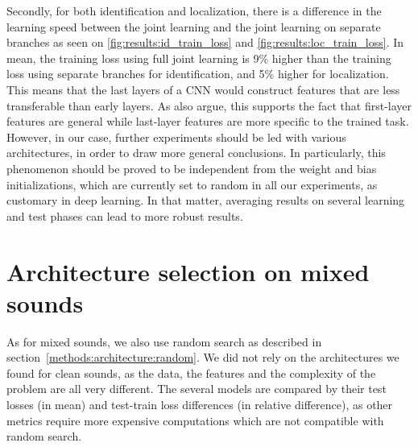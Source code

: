 Secondly, for both identification and localization, there is a difference in the learning speed between the joint learning and the joint learning on separate branches as seen on \ref{fig:results:id_train_loss} and \ref{fig:results:loc_train_loss}. In mean, the training loss using full joint learning is 9\% higher than the training loss using separate branches for identification, and 5\% higher for localization. This means that the last layers of a CNN would construct features that are less transferable than early layers. As \citeauthor{yosinski2014transferable} \parencite{yosinski2014transferable} also argue, this supports the fact that first-layer features are general while last-layer features are more specific to the trained task. However, in our case, further experiments should be led with various architectures, in order to draw more general conclusions. In particularly, this phenomenon should be proved to be independent from the weight and bias initializations, which are currently set to random in all our experiments, as customary in deep learning. In that matter, averaging results on several learning and test phases can lead to more robust results.


\section{Architecture selection on mixed sounds}
\label{sec:results:mixed}

As for mixed sounds, we also use random search as described in section~\ref{methods:architecture:random}. We did not rely on the architectures we found for clean sounds, as the data, the features and the complexity of the problem are all very different. The several models are compared by their test losses (in mean) and test-train loss differences (in relative difference), as other metrics require more expensive computations which are not compatible with random search.

